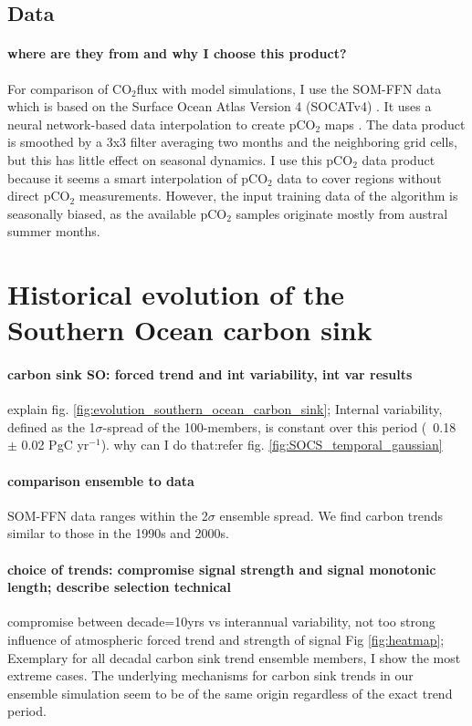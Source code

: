\documentclass[12pt]{article}
\begin{document}
\subsection{Data}
\paragraph{where are they from and why I choose this product?}
For comparison of CO$_2$flux with model simulations, I use the SOM-FFN data  which is based on the Surface Ocean Atlas Version 4 (SOCATv4) \citep{landschuetzer2016}. It uses a neural network-based data interpolation to create pCO$_2$ maps \citep{Landschuetzer2014}. The data product is smoothed by a 3x3 filter averaging two months and the neighboring grid cells, but this has little effect on seasonal dynamics. I use this pCO$_2$ data product because it seems a smart interpolation of pCO$_2$ data to cover regions without direct pCO$_2$ measurements. However, the input training data of the algorithm is seasonally biased, as the available pCO$_2$ samples originate mostly from austral summer months.



\clearpage

\section{Historical evolution of the Southern Ocean carbon sink}

\paragraph{carbon sink SO: forced trend and int variability, int var results} explain fig. \ref{fig:evolution_southern_ocean_carbon_sink}; 
Internal variability, defined as the 1$\sigma$-spread of the 100-members, is constant over this period (~0.18 $\pm$ 0.02 PgC yr$^{-1}$).
why can I do that:refer fig. \ref{fig:SOCS_temporal_gaussian} 

\paragraph{comparison ensemble to data} SOM-FFN data ranges within the 2$\sigma$ ensemble spread. We find carbon trends similar to those in the 1990s and 2000s. 


\paragraph{choice of trends: compromise signal strength and signal monotonic length; describe selection technical} compromise between decade=10yrs vs interannual variability, not too strong influence of atmospheric forced trend and strength of signal Fig \ref{fig:heatmap}; Exemplary for all decadal carbon sink trend ensemble members, I show the most extreme cases. The underlying mechanisms for carbon sink trends in our ensemble simulation seem to be of the same origin regardless of the exact trend period.
\end{document}
